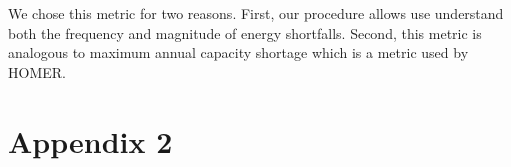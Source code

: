 \documentclass{article}
\begin{document}
We chose this metric for two reasons.
First, our procedure allows use understand both the frequency and magnitude of energy shortfalls. 
Second, this metric is analogous to maximum annual capacity shortage which is a metric used by HOMER.


\section{Appendix 2}


\begin{thebibliography}{9}


\end{thebibliography}
\end{document}

